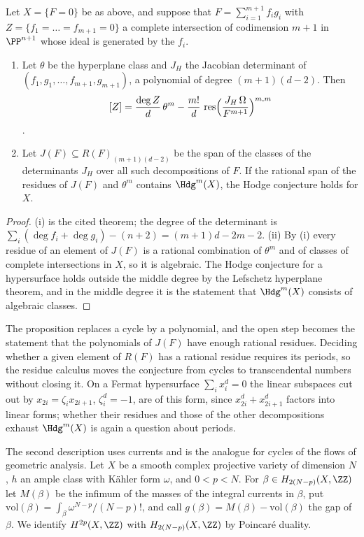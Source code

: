 \begin{proposition}\label{prop:residues}
Let $X=\{F=0\}$ be as above, and suppose that $F=\sum_{i=1}^{m+1}f_{i}g_{i}$ with $Z=\{f_{1}=\dots=f_{m+1}=0\}$ a complete intersection of codimension $m+1$ in $\PP^{n+1}$ whose ideal is generated by the $f_{i}$.
\begin{enumerate}[label=\textup{(\roman*)},leftmargin=2.4em,itemsep=2pt]
\item Let $\theta$ be the hyperplane class and $J_{H}$ the Jacobian determinant of $(f_{1},g_{1},\dots,f_{m+1},g_{m+1})$, a polynomial of degree $(m+1)(d-2)$. Then
\[
[Z]=\frac{\deg Z}{d}\,\theta^{m}-\frac{m!}{d}\,\operatorname{res}\Bigl(\frac{J_{H}\,\Omega}{F^{m+1}}\Bigr)^{m,m}
\]
\cite[Thm.~1.1]{VL22}.
\item Let $J(F)\subseteq R(F)_{(m+1)(d-2)}$ be the span of the classes of the determinants $J_{H}$ over all such decompositions of $F$. If the rational span of the residues of $J(F)$ and $\theta^{m}$ contains $\Hdg^{m}(X)$, the Hodge conjecture holds for $X$.
\end{enumerate}
\end{proposition}

\begin{proof}
(i) is the cited theorem; the degree of the determinant is $\sum_{i}(\deg f_{i}+\deg g_{i})-(n+2)=(m+1)d-2m-2$. (ii) By (i) every residue of an element of $J(F)$ is a rational combination of $\theta^{m}$ and of classes of complete intersections in $X$, so it is algebraic. The Hodge conjecture for a hypersurface holds outside the middle degree by the Lefschetz hyperplane theorem, and in the middle degree it is the statement that $\Hdg^{m}(X)$ consists of algebraic classes.
\end{proof}

The proposition replaces a cycle by a polynomial, and the open step becomes the statement that the polynomials of $J(F)$ have enough rational residues. Deciding whether a given element of $R(F)$ has a rational residue requires its periods, so the residue calculus moves the conjecture from cycles to transcendental numbers without closing it. On a Fermat hypersurface $\sum_{i}x_{i}^{d}=0$ the linear subspaces cut out by $x_{2i}=\zeta_{i}x_{2i+1}$, $\zeta_{i}^{d}=-1$, are of this form, since $x_{2i}^{d}+x_{2i+1}^{d}$ factors into linear forms; whether their residues and those of the other decompositions exhaust $\Hdg^{m}(X)$ is again a question about periods.

The second description uses currents and is the analogue for cycles of the flows of geometric analysis. Let $X$ be a smooth complex projective variety of dimension $N$, $h$ an ample class with K\"ahler form $\omega$, and $0<p<N$. For $\beta\in H_{2(N-p)}(X,\ZZ)$ let $M(\beta)$ be the infimum of the masses of the integral currents in $\beta$, put $\mathrm{vol}(\beta)=\int_{\beta}\omega^{N-p}/(N-p)!$, and call $g(\beta)=M(\beta)-\mathrm{vol}(\beta)$ the gap of $\beta$. We identify $H^{2p}(X,\ZZ)$ with $H_{2(N-p)}(X,\ZZ)$ by Poincar\'e duality.

